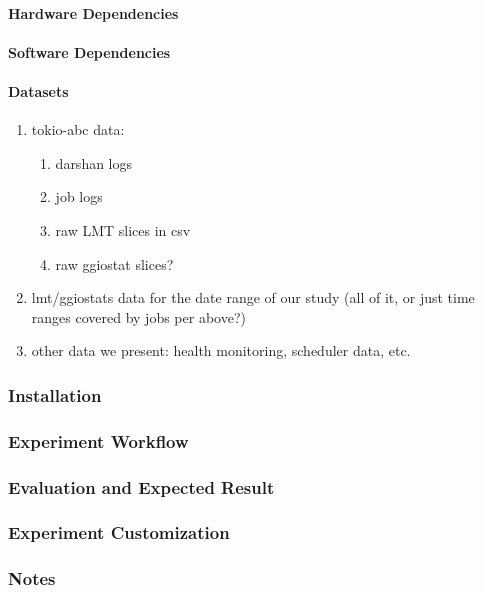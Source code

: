 \paragraph{Hardware Dependencies}

\paragraph{Software Dependencies}

\paragraph{Datasets}

\begin{enumerate}
	\item tokio-abc data:
    \begin{enumerate}
        \item darshan logs
		\item job logs
        \item raw LMT slices in csv
        \item raw ggiostat slices?
    \end{enumerate}
	\item lmt/ggiostats data for the date range of our study (all of it, or just time ranges covered by jobs per above?)
    \item other data we present: health monitoring, scheduler data, etc.
\end{enumerate}

\subsubsection{Installation}

\subsubsection{Experiment Workflow}

\subsubsection{Evaluation and Expected Result}

\subsubsection{Experiment Customization}

\subsubsection{Notes}
